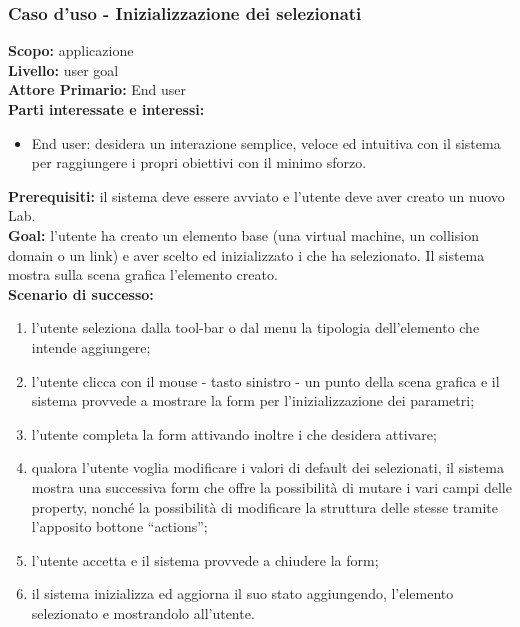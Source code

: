 \begin{flushleft}
\begin{boxedminipage}{\textwidth}

\subsubsection*{Caso d'uso - Inizializzazione dei \plugin{} selezionati}

\textbf{Scopo:} applicazione \visualnetkit{} \\
\textbf{Livello:} user goal \\
\textbf{Attore Primario:} End user \\
\textbf{Parti interessate e interessi:}
\begin{itemize}
\item End user: desidera un interazione semplice, veloce ed intuitiva con il sistema per raggiungere i propri obiettivi con il minimo sforzo.
\end{itemize}

\textbf{Prerequisiti:} il sistema deve essere avviato e l'utente deve aver creato un nuovo Lab. \\
\textbf{Goal:} l'utente ha creato un elemento base (una virtual machine, un collision domain o un link) e aver scelto ed inizializzato i \plugin{} che ha selezionato. Il sistema mostra sulla scena grafica l'elemento creato. \\

\textbf{Scenario di successo:}
\begin{enumerate}
\item l'utente seleziona dalla tool-bar o dal menu la tipologia dell'elemento che intende aggiungere;
\item l'utente clicca con il mouse - tasto sinistro - un punto della scena grafica e il sistema provvede a mostrare la form per l'inizializzazione dei parametri;
\item l'utente completa la form attivando inoltre i \plugin{} che desidera attivare;
\item qualora l'utente voglia modificare i valori di default dei \plugin{} selezionati, il sistema mostra una successiva form che offre la possibilità di mutare i vari campi delle property, nonché la possibilità di modificare la struttura delle stesse tramite l'apposito bottone ``actions'';
\item l'utente accetta e il sistema provvede a chiudere la form;
\item il sistema inizializza ed aggiorna il suo stato aggiungendo, l'elemento selezionato e mostrandolo all'utente.
\end{enumerate}

\end{boxedminipage}
\end{flushleft}

